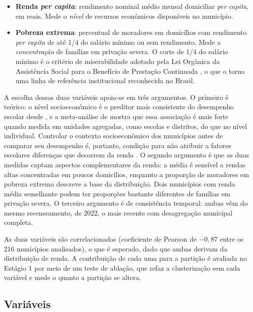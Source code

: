 \begin{itemize}
    \item \textbf{Renda \textit{per capita}}: rendimento nominal médio mensal domiciliar \textit{per capita}, em reais. Mede o \emph{nível} de recursos econômicos disponíveis no município.
    \item \textbf{Pobreza extrema}: percentual de moradores em domicílios com rendimento \textit{per capita} de até 1/4 do salário mínimo ou sem rendimento. Mede a \emph{concentração} de famílias em privação severa. O corte de 1/4 do salário mínimo é o critério de miserabilidade adotado pela Lei Orgânica da Assistência Social para o Benefício de Prestação Continuada \citep{brasil1993}, o que o torna uma linha de referência institucional reconhecida no Brasil.
\end{itemize}

A escolha dessas duas variáveis apoia-se em três argumentos. O primeiro é teórico: o nível socioeconômico é o preditor mais consistente do desempenho escolar desde \citet{coleman1966}, e a meta-análise de \citet{sirin2005} mostra que essa associação é mais forte quando medida em unidades agregadas, como escolas e distritos, do que no nível individual. Controlar o contexto socioeconômico dos municípios antes de comparar seu desempenho é, portanto, condição para não atribuir a fatores escolares diferenças que decorrem da renda \citep{albernaz2002}. O segundo argumento é que as duas medidas captam aspectos complementares da renda: a média é sensível a rendas altas concentradas em poucos domicílios, enquanto a proporção de moradores em pobreza extrema descreve a base da distribuição. Dois municípios com renda média semelhante podem ter proporções bastante diferentes de famílias em privação severa. O terceiro argumento é de consistência temporal: ambas vêm do mesmo recenseamento, de 2022, o mais recente com desagregação municipal completa.

As duas variáveis são correlacionadas (coeficiente de Pearson de $-0{,}87$ entre os 216 municípios analisados), o que é esperado, dado que ambas derivam da distribuição de renda. A contribuição de cada uma para a partição é avaliada no Estágio 1 por meio de um teste de ablação, que refaz a clusterização sem cada variável e mede o quanto a partição se altera.

\subsection{Variáveis}

